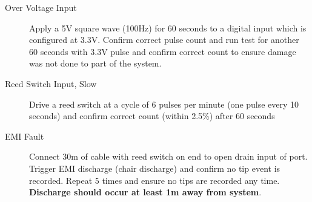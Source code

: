 \begin{description}
\item [Over Voltage Input] Apply a 5V square wave (100Hz) for 60 seconds to a digital input which is configured at 3.3V. Confirm correct pulse count and run test for another 60 seconds with 3.3V pulse and confirm correct count to ensure damage was not done to part of the system. 
\item [Reed Switch Input, Slow] Drive a reed switch at a cycle of 6 pulses per minute (one pulse every 10 seconds) and confirm correct count (within 2.5\%) after 60 seconds
\item [EMI Fault] Connect 30m of cable with reed switch on end to open drain input of port. Trigger EMI discharge (chair discharge) and confirm no tip event is recorded. Repeat 5 times and ensure no tips are recorded any time. \textbf{Discharge should occur at least 1m away from system}.
\end{description}



